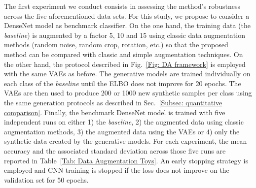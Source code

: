 \documentclass[10pt,journal,compsoc]{IEEEtran}
\begin{document}
The first experiment we conduct consists in assessing the method's robustness across the five aforementioned data sets. For this study, we propose to consider a DenseNet model as benchmark classifier. On the one hand, the training data (the \emph{baseline}) is augmented by a factor 5, 10 and 15 using classic data augmentation methods (random noise, random crop, rotation, etc.) so that the proposed method can be compared with classic and simple augmentation techniques. On the other hand, the protocol described in Fig.~\ref{Fig: DA framework} is employed with the same VAEs as before. The generative models are trained individually on each class of the \emph{baseline} until the ELBO does not improve for 20 epochs. The VAEs are then used to produce 200 or 1000 new synthetic samples per class using the same generation protocols as described in Sec.~\ref{Subsec: quantitative comparison}. Finally, the benchmark DenseNet model is trained with five independent runs on either 1) the \emph{baseline}, 2) the augmented data using classic augmentation methods, 3) the augmented data using the VAEs or 4) only the synthetic data created by the generative models. For each experiment, the mean accuracy and the associated standard deviation across those five runs are reported in Table~\ref{Tab: Data Augmentation Toys}. An early stopping strategy is employed and CNN training is stopped if the loss does not improve on the validation set for 50 epochs. 
\end{document}
